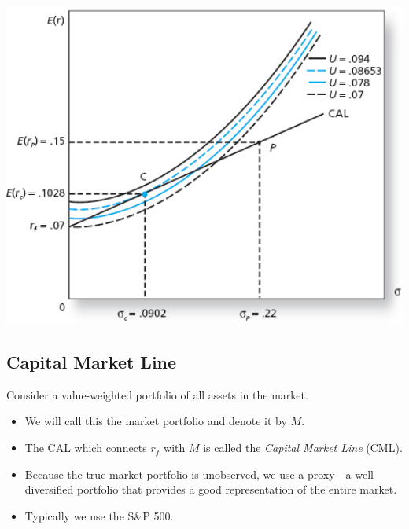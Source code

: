 \documentclass[letterpaper,10pt,english]{sphinxmanual}
\begin{document}
\includegraphics[width=6in]{pg177_2.jpg}


\subsection{Capital Market Line}
\label{allocation:capital-market-line}
Consider a value-weighted portfolio of all assets in the
market.
\begin{itemize}
\item {} 
We will call this the market portfolio and denote it by
$M$.

\end{itemize}
\begin{itemize}
\item {} 
The CAL which connects $r_f$ with $M$ is called the
\emph{Capital Market Line} (CML).

\end{itemize}
\begin{itemize}
\item {} 
Because the true market portfolio is unobserved, we use a
proxy - a well diversified portfolio that provides a good
representation of the entire market.

\end{itemize}
\begin{itemize}
\item {} 
Typically we use the S\&P 500.

\end{itemize}
\end{document}
